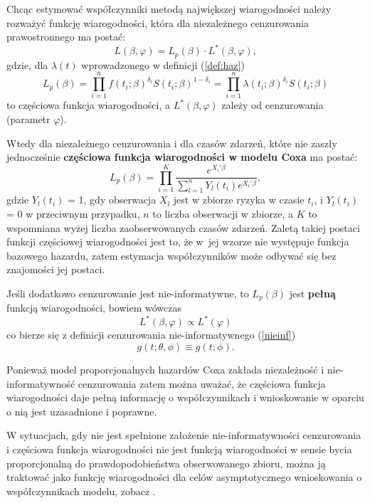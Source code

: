 Chcąc estymować współczynniki metodą największej wiarogodności należy rozważyć funkcję wiarogodności, która dla niezależnego cenzurowania prawostronnego ma postać:
\begin{equation}
L(\beta,\varphi) = L_p(\beta)\cdot L^{*}(\beta,\varphi),
\end{equation}
gdzie, dla $\lambda(t)$ wprowadzonego w definicji (\ref{def:haz})
\begin{equation}
L_p(\beta) = \prod\limits_{i=1}^{n}f(t_i;\beta)^{\delta_i}S(t_i;\beta)^{1-\delta_i}=\prod\limits_{i=1}^{n}\lambda(t_i;\beta)^{\delta_i}S(t_i;\beta)
\end{equation}
to częściowa funkcja wiarogodności, a $L^{*}(\beta,\varphi)$ zależy od cenzurowania (parametr $\varphi$).

Wtedy dla niezależnego cenzurowania i dla czasów zdarzeń, które nie zaszły jednocześnie \textbf{częściowa funkcja wiarogodności w modelu Coxa} ma postać:
\begin{equation}
L_p(\beta) = \prod\limits_{i=1}^{K}\dfrac{e^{X_i'\beta}}{\sum\limits_{l=1}^{n}Y_l(t_i)e^{X_l'\beta}},
\end{equation}
gdzie $Y_l(t_i)$ = 1, gdy obserwacja $X_l$ jest w zbiorze ryzyka w czasie $t_i$, i $Y_l(t_i)$ = 0 w przeciwnym przypadku, $n$ to liczba obserwacji w zbiorze, a $K$ to wspomniana wyżej liczba zaobserwowanych czasów zdarzeń. Zaletą takiej postaci funkcji częściowej wiarogodności jest to, że w~jej wzorze nie występuje funkcja bazowego hazardu, zatem estymacja współczynników może odbywać się bez znajomości jej postaci.

Jeśli dodatkowo cenzurowanie jest nie-informatywne, to $L_p(\beta)$ jest \textbf{pełną} funkcją wiarogodności, bowiem wówczas $$L^{*}(\beta,\varphi)\propto L^{*}(\varphi)$$ co bierze się z definicji cenzurowania nie-informatywnego (\ref{nieinf}) $$g(t;\theta, \phi) \equiv g(t;\phi).$$

Ponieważ model proporcjonalnych hazardów Coxa zakłada niezależność i nie-informatywność cenzurowania zatem można uważać, że częściowa funkcja wiarogodności daje pełną informację o współczynnikach i wnioskowanie w oparciu o nią jest uzasadnione i poprawne.

W sytuacjach, gdy nie jest spełnione założenie nie-informatywności cenzurowania i częściowa funkcja wiarogodności nie jest funkcją wiarogodności w sensie bycia proporcjonalną do prawdopodobieństwa obserwowanego zbioru, można ją traktować jako funkcję wiarogodności dla celów asymptotycznego wnioskowania o współczynnikach modelu, zobacz \cite{???}.


